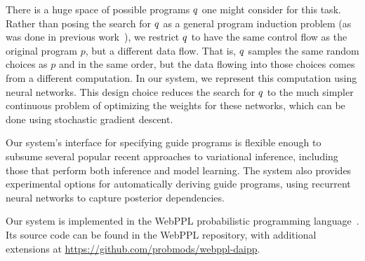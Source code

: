 There is a huge space of possible programs $q$ one might consider for this task. Rather than posing the search for $q$ as a general program induction problem (as was done in previous work~\cite{GuidePrograms}), we restrict $q$ to have the same control flow as the original program $p$, but a different data flow.
That is, $q$ samples the same random choices as $p$ and in the same order, but the data flowing into those choices comes from a different computation.
In our system, we represent this computation using neural networks.
This design choice reduces the search for $q$ to the much simpler continuous problem of optimizing the weights for these networks, which can be done using stochastic gradient descent.

Our system's interface for specifying guide programs is flexible enough to subsume several popular recent approaches to variational inference, including those that perform both inference and model learning. The system also provides experimental options for automatically deriving guide programs, using recurrent neural networks to capture posterior dependencies.~

Our system is implemented in the WebPPL probabilistic programming language~\cite{WebPPL}. Its source code can be found in the WebPPL repository, with additional extensions at \url{https://github.com/probmods/webppl-daipp}.